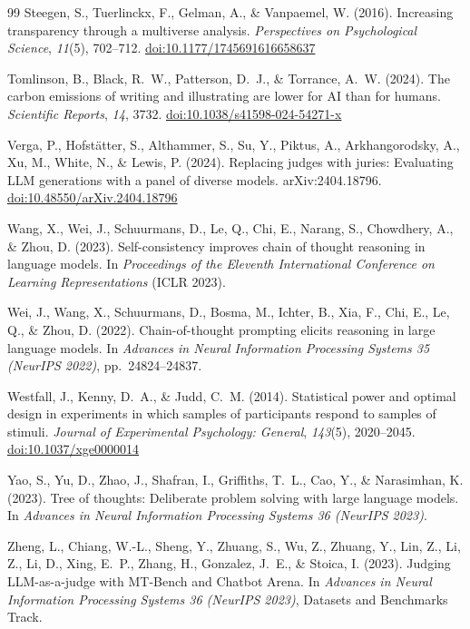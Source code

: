 \documentclass[12pt,a4paper]{article}
\begin{document}
\begin{thebibliography}{99}
Steegen, S., Tuerlinckx, F., Gelman, A., \& Vanpaemel, W. (2016).
Increasing transparency through a multiverse analysis.
\textit{Perspectives on Psychological Science}, \textit{11}(5), 702--712.
\href{https://doi.org/10.1177/1745691616658637}{doi:10.1177/1745691616658637}

Tomlinson, B., Black, R.~W., Patterson, D.~J., \& Torrance, A.~W. (2024).
The carbon emissions of writing and illustrating are lower for AI than for
  humans.
\textit{Scientific Reports}, \textit{14}, 3732.
\href{https://doi.org/10.1038/s41598-024-54271-x}{doi:10.1038/s41598-024-54271-x}

Verga, P., Hofst\"atter, S., Althammer, S., Su, Y., Piktus, A.,
  Arkhangorodsky, A., Xu, M., White, N., \& Lewis, P. (2024).
Replacing judges with juries: Evaluating LLM generations with a panel of diverse
  models.
arXiv:2404.18796.
\href{https://doi.org/10.48550/arXiv.2404.18796}{doi:10.48550/arXiv.2404.18796}

Wang, X., Wei, J., Schuurmans, D., Le, Q., Chi, E., Narang, S., Chowdhery, A.,
  \& Zhou, D. (2023).
Self-consistency improves chain of thought reasoning in language models.
In \textit{Proceedings of the Eleventh International Conference on Learning
  Representations} (ICLR 2023).

Wei, J., Wang, X., Schuurmans, D., Bosma, M., Ichter, B., Xia, F., Chi, E.,
  Le, Q., \& Zhou, D. (2022).
Chain-of-thought prompting elicits reasoning in large language models.
In \textit{Advances in Neural Information Processing Systems 35 (NeurIPS 2022)},
  pp.~24824--24837.

Westfall, J., Kenny, D.~A., \& Judd, C.~M. (2014).
Statistical power and optimal design in experiments in which samples of
  participants respond to samples of stimuli.
\textit{Journal of Experimental Psychology: General}, \textit{143}(5),
  2020--2045.
\href{https://doi.org/10.1037/xge0000014}{doi:10.1037/xge0000014}

Yao, S., Yu, D., Zhao, J., Shafran, I., Griffiths, T.~L., Cao, Y., \&
  Narasimhan, K. (2023).
Tree of thoughts: Deliberate problem solving with large language models.
In \textit{Advances in Neural Information Processing Systems 36 (NeurIPS 2023)}.

Zheng, L., Chiang, W.-L., Sheng, Y., Zhuang, S., Wu, Z., Zhuang, Y., Lin, Z.,
  Li, Z., Li, D., Xing, E.~P., Zhang, H., Gonzalez, J.~E., \& Stoica, I.
  (2023).
Judging LLM-as-a-judge with MT-Bench and Chatbot Arena.
In \textit{Advances in Neural Information Processing Systems 36 (NeurIPS 2023)},
  Datasets and Benchmarks Track.

\end{thebibliography}


\clearpage
\end{document}

